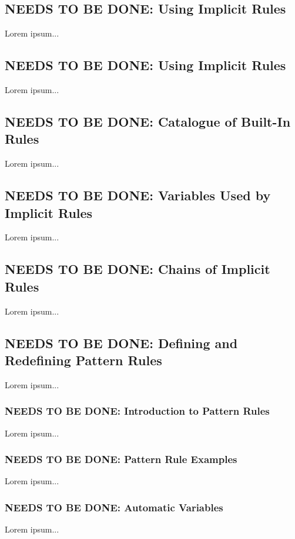 \documentclass{charun}
\begin{document}
\begin{multicols*}{2}
\color{gray}
\section{NEEDS TO BE DONE: Using Implicit Rules}
Lorem ipsum...
\color{black}


\color{gray}
\subsection{NEEDS TO BE DONE: Using Implicit Rules}
Lorem ipsum...
\color{black}

\color{gray}
\subsection{NEEDS TO BE DONE: Catalogue of Built-In Rules}
Lorem ipsum...
\color{black}

\color{gray}
\subsection{NEEDS TO BE DONE: Variables Used by Implicit Rules}
Lorem ipsum...
\color{black}

\color{gray}
\subsection{NEEDS TO BE DONE: Chains of Implicit Rules}
Lorem ipsum...
\color{black}

\color{gray}
\subsection{NEEDS TO BE DONE: Defining and Redefining Pattern Rules}
Lorem ipsum...
\color{black}

\color{gray}
\subsubsection{NEEDS TO BE DONE: Introduction to Pattern Rules}
Lorem ipsum...
\color{black}

\color{gray}
\subsubsection{NEEDS TO BE DONE: Pattern Rule Examples}
Lorem ipsum...
\color{black}

\color{gray}
\subsubsection{NEEDS TO BE DONE: Automatic Variables}
Lorem ipsum...
\color{black}


\end{multicols*}
\end{document}
